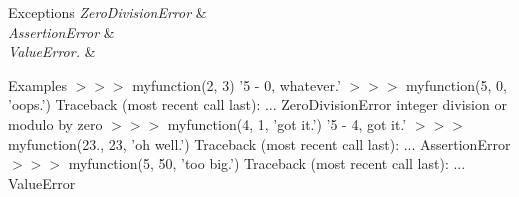 \begin{DoxyExceptions}{Exceptions}
{\em Zero\-Division\-Error} & \\
\hline
{\em Assertion\-Error} & \\
\hline
{\em Value\-Error.} & \\
\hline
\end{DoxyExceptions}
\begin{DoxyParagraph}{Examples}
$>$$>$$>$ myfunction(2, 3) '5 -\/ 0, whatever.' $>$$>$$>$ myfunction(5, 0, 'oops.') Traceback (most recent call last)\-: ... Zero\-Division\-Error integer division or modulo by zero $>$$>$$>$ myfunction(4, 1, 'got it.') '5 -\/ 4, got it.' $>$$>$$>$ myfunction(23., 23, 'oh well.') Traceback (most recent call last)\-: ... Assertion\-Error $>$$>$$>$ myfunction(5, 50, 'too big.') Traceback (most recent call last)\-: ... Value\-Error 
\end{DoxyParagraph}
